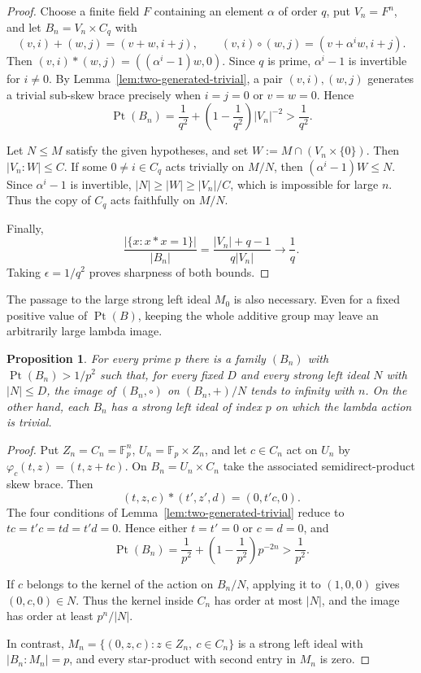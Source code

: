 \documentclass[11pt, oneside]{amsart}
\numberwithin{equation}{section}
\theoremstyle{plain}
\newtheorem{pro}[equation]{Proposition}
\theoremstyle{definition}
\newcommand{\Pt}{\operatorname{Pt} }
\begin{document}
\begin{proof}
Choose a finite field $F$ containing an element $\alpha$ of order $q$,
put $V_n=F^n$, and let $B_n=V_n\times C_q$ with
$$
(v,i)+(w,j)=(v+w,i+j),\qquad
(v,i)\circ(w,j)=(v+\alpha^iw,i+j).
$$
Then $(v,i)*(w,j)=((\alpha^i-1)w,0)$. Since $q$ is prime,
$\alpha^i-1$ is invertible for $i\neq0$. By
Lemma~\ref{lem:two-generated-trivial}, a pair
$(v,i),(w,j)$ generates a trivial sub-skew brace precisely when
$i=j=0$ or $v=w=0$. Hence
$$
\Pt(B_n)=\frac1{q^2}+
\left(1-\frac1{q^2}\right)|V_n|^{-2}>\frac1{q^2}.
$$

Let $N\leqslant M$ satisfy the given hypotheses, and set
$W :=M\cap(V_n\times\{0\})$. Then $|V_n:W|\leqslant C$. If some
$0\neq i\in C_q$ acts trivially on $M/N$, then
$(\alpha^i-1)W\leqslant N$. Since $\alpha^i-1$ is invertible,
$|N|\geqslant|W|\geqslant|V_n|/C$, which is impossible for large $n$.
Thus the copy of $C_q$ acts faithfully on $M/N$.

Finally,
$$
\frac{|\{x:x*x= 1\}|}{|B_n|}
=\frac{|V_n|+q-1}{q|V_n|}\longrightarrow\frac1q.
$$
Taking $\epsilon=1/q^2$ proves sharpness of both bounds.
\end{proof}

The passage to the large strong left ideal $M_0$ is also necessary.
Even for a fixed positive value of $\Pt(B)$, keeping the whole additive
group may leave an arbitrarily large lambda image.

\begin{pro} %
For every prime $p$ there is a family $(B_n)$ with
$\Pt(B_n)>1/p^2$ such that, for every fixed $D$ and every strong left
ideal $N$ with $|N|\leqslant D$, the image of
$(B_n,\circ)$ on $(B_n,+)/N$ tends to infinity with $n$. On the other
hand, each $B_n$ has a strong left ideal of index $p$ on which the
lambda action is trivial.
\end{pro}

\begin{proof}
Put $Z_n=C_n=\mathbb F_p^n$, $U_n=\mathbb F_p\times Z_n$, and let
$c\in C_n$ act on $U_n$ by
$\varphi_c(t,z)=(t,z+tc)$. On $B_n=U_n\times C_n$ take the associated
semidirect-product skew brace. Then
$$
(t,z,c)*(t',z',d)=(0,t'c,0).
$$
The four conditions of Lemma~\ref{lem:two-generated-trivial} reduce to
$tc=t'c=td=t'd=0$. Hence either $t=t'=0$ or $c=d=0$, and
$$
\Pt(B_n)=\frac1{p^2}+
\left(1-\frac1{p^2}\right)p^{-2n}>\frac1{p^2}.
$$

If $c$ belongs to the kernel of the action on $B_n/N$, applying it to
$(1,0,0)$ gives $(0,c,0)\in N$. Thus the kernel inside $C_n$ has order
at most $|N|$, and the image has order at least $p^n/|N|$.

In contrast,
$M_n=\{(0,z,c):z\in Z_n,\ c\in C_n\}$ is a strong left ideal with
$|B_n:M_n|=p$, and every star-product with second entry in $M_n$ is
zero.
\end{proof}
\end{document}
